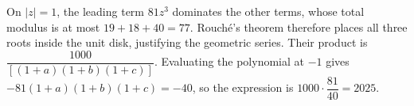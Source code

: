 On $|z|=1$, the leading term $81z^3$ dominates the other terms, whose total modulus is at most $19+18+40=77$. Rouch\'e's theorem therefore places all three roots inside the unit disk, justifying the geometric series. Their product is $\dfrac{1000}{[(1+a)(1+b)(1+c)]}$. Evaluating the polynomial at $-1$ gives $-81(1+a)(1+b)(1+c)=-40$, so the expression is $1000\cdot\dfrac{81}{40}=\boxed{2025}$.
